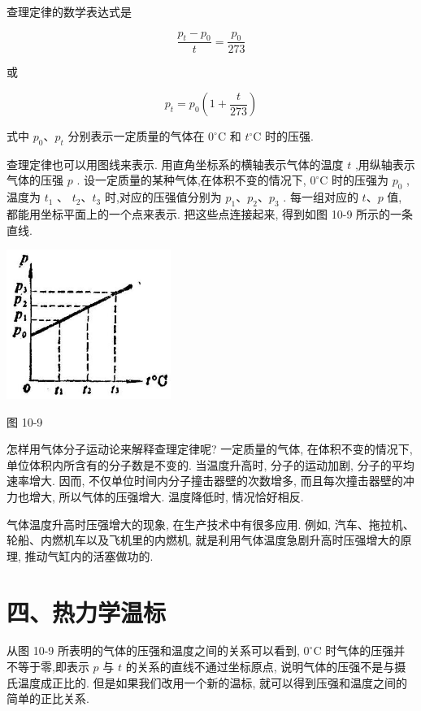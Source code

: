 \documentclass[10pt]{article}
\begin{document}
查理定律的数学表达式是

\[
\frac{{p}_{t} - {p}_{0}}{t} = \frac{{p}_{0}}{273}
\]

或

\[
{p}_{t} = {p}_{0}\left( {1 + \frac{t}{273}}\right)
\]

式中 \({p}_{0}\text{、}{p}_{t}\) 分别表示一定质量的气体在 \({0}^{ \circ }\mathrm{C}\) 和 \({t}^{ \circ }\mathrm{C}\) 时的压强.

查理定律也可以用图线来表示. 用直角坐标系的横轴表示气体的温度 \(t\) ,用纵轴表示气体的压强 \(p\) . 设一定质量的某种气体,在体积不变的情况下, \({0}^{ \circ }\mathrm{C}\) 时的压强为 \({p}_{0}\) ,温度为 \({t}_{1}\) 、 \({t}_{2}\text{、}{t}_{3}\) 时,对应的压强值分别为 \({p}_{1}\text{、}{p}_{2}\text{、}{p}_{3}\) . 每一组对应的 \(t\text{、}p\) 值, 都能用坐标平面上的一个点来表示. 把这些点连接起来, 得到如图 10-9 所示的一条直线.

\begin{center}
\includegraphics[max width=0.4\textwidth]{images/01912d55-147c-70aa-b0e0-1782a122f948_290_228580.jpg}
\end{center}

图 10-9

怎样用气体分子运动论来解释查理定律呢? 一定质量的气体, 在体积不变的情况下, 单位体积内所含有的分子数是不变的. 当温度升高时, 分子的运动加剧, 分子的平均速率增大. 因而, 不仅单位时间内分子撞击器壁的次数增多, 而且每次撞击器壁的冲力也增大, 所以气体的压强增大. 温度降低时, 情况恰好相反.

气体温度升高时压强增大的现象, 在生产技术中有很多应用. 例如, 汽车、拖拉机、轮船、内燃机车以及飞机里的内燃机, 就是利用气体温度急剧升高时压强增大的原理, 推动气缸内的活塞做功的.

\section*{四、热力学温标}

从图 10-9 所表明的气体的压强和温度之间的关系可以看到, \({0}^{ \circ }\mathrm{C}\) 时气体的压强并不等于零,即表示 \(p\) 与 \(t\) 的关系的直线不通过坐标原点, 说明气体的压强不是与摄氏温度成正比的. 但是如果我们改用一个新的温标, 就可以得到压强和温度之间的简单的正比关系.
\end{document}
